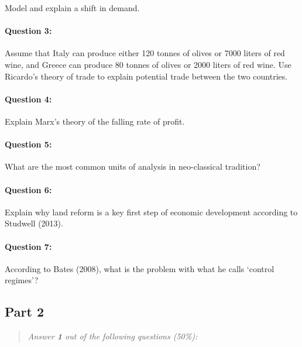\documentclass[a4paper,12pt,fleqn]{article}
\begin{document}
Model and explain a shift in demand.

\paragraph{\textbf{Question 3:}}

Assume that Italy can produce either 120 tonnes of olives or 7000 liters of red wine,
and Greece can produce 80 tonnes of olives or 2000 liters of red wine. Use
Ricardo's theory of trade to explain potential trade between the two countries.

%

\paragraph{\textbf{Question 4:}}

Explain Marx's theory of the falling rate of profit.

\paragraph{\textbf{Question 5:}}

What are the most common units of analysis in neo-classical tradition?

\paragraph{\textbf{Question 6:}}

Explain why land reform is a key first step of economic development according to
Studwell (2013).

\paragraph{\textbf{Question 7:}}

According to Bates (2008), what is the problem with what he calls `control
regimes'?

\bigskip
\subsection*{Part 2}
\begin{quote}
	\textit{Answer \textbf{1} out of the following questions (50\%):}
\end{quote}
\end{document}
